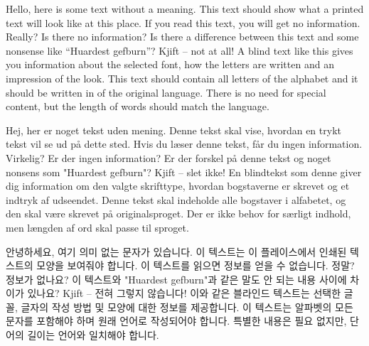 
\newenvironment{abstractpage}
{\vspace*{\fill}\thispagestyle{empty}}
{\vfill\clearpage}
\renewenvironment{abstract}[1]
{\bigskip\selectlanguage{#1}%
	\begin{center}\bfseries\abstractname\end{center}}
{\par\bigskip}

\begin{abstractpage}
	\begin{abstract}{english}
		Hello, here is some text without a meaning. This text should show what a printed text will look like at this place. If you read this text, you will get no information. Really? Is there no information? Is there a difference between this text and some nonsense like “Huardest gefburn”? Kjift – not at all! A blind text like this gives you information about the selected font, how the letters are written and an impression of the look. This text should contain all letters of the alphabet and it should be written in of the original language. There is no need for special content, but the length of words should match the language.
	\end{abstract}
	
	\begin{abstract}{danish}
		Hej, her er noget tekst uden mening. Denne tekst skal vise, hvordan en trykt tekst vil se ud på dette sted. Hvis du læser denne tekst, får du ingen information. Virkelig? Er der ingen information? Er der forskel på denne tekst og noget nonsens som "Huardest gefburn"? Kjift – slet ikke! En blindtekst som denne giver dig information om den valgte skrifttype, hvordan bogstaverne er skrevet og et indtryk af udseendet. Denne tekst skal indeholde alle bogstaver i alfabetet, og den skal være skrevet på originalsproget. Der er ikke behov for særligt indhold, men længden af ord skal passe til sproget.
	\end{abstract}
	
	\begin{abstract}{korean}
		안녕하세요, 여기 의미 없는 문자가 있습니다. 이 텍스트는 이 플레이스에서 인쇄된 텍스트의 모양을 보여줘야 합니다. 이 텍스트를 읽으면 정보를 얻을 수 없습니다. 정말? 정보가 없나요? 이 텍스트와 "Huardest gefburn"과 같은 말도 안 되는 내용 사이에 차이가 있나요? Kjift – 전혀 그렇지 않습니다! 이와 같은 블라인드 텍스트는 선택한 글꼴, 글자의 작성 방법 및 모양에 대한 정보를 제공합니다. 이 텍스트는 알파벳의 모든 문자를 포함해야 하며 원래 언어로 작성되어야 합니다. 특별한 내용은 필요 없지만, 단어의 길이는 언어와 일치해야 합니다.
	\end{abstract}
\end{abstractpage}